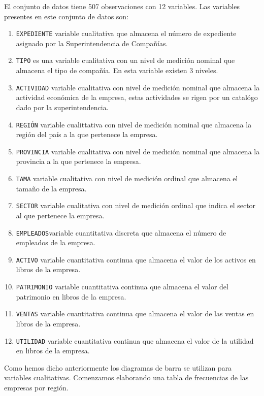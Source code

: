 \documentclass[
]{krantz}
\providecommand{\tightlist}{%
  \setlength{\itemsep}{0pt}\setlength{\parskip}{0pt}}
\begin{document}
El conjunto de datos tiene 507 observaciones con 12 variables. Las variables presentes en este conjunto de datos son:

\begin{enumerate}
\def\labelenumi{\arabic{enumi}.}
\tightlist
\item
  \texttt{EXPEDIENTE} variable cualitativa que almacena el número de expediente asignado por la Superintendencia de Compañías.
\item
  \texttt{TIPO} es una variable cualitativa con un nivel de medición nominal que almacena el tipo de compañía. En esta variable existen 3 niveles.
\item
  \texttt{ACTIVIDAD} variable cualitativa con nivel de medición nominal que almacena la actividad económica de la empresa, estas actividades se rigen por un catalógo dado por la superintendencia.
\item
  \texttt{REGIÓN} variable cualittativa con nivel de medición nominal que almacena la región del país a la que pertenece la empresa.
\item
  \texttt{PROVINCIA} variable cualitativa con nivel de medición nominal que almacena la provincia a la que pertenece la empresa.
\item
  \texttt{TAMA} variable cualitativa con nivel de medición ordinal que almacena el tamaño de la empresa.
\item
  \texttt{SECTOR} variable cualitativa con nivel de medición ordinal que indica el sector al que pertenece la empresa.
\item
  \texttt{EMPLEADOS}variable cuantitativa discreta que almacena el número de empleados de la empresa.
\item
  \texttt{ACTIVO} variable cuantitativa continua que almacena el valor de los activos en libros de la empresa.
\item
  \texttt{PATRIMONIO} variable cuantitativa continua que almacena el valor del patrimonio en libros de la empresa.
\item
  \texttt{VENTAS} variable cuantitativa continua que almacena el valor de las ventas en libros de la empresa.
\item
  \texttt{UTILIDAD} variable cuantitativa continua que almacena el valor de la utilidad en libros de la empresa.
\end{enumerate}

Como hemos dicho anteriormente los diagramas de barra se utilizan para variables cualitativas. Comenzamos elaborando una tabla de frecuencias de las empresas por región.
\end{document}
